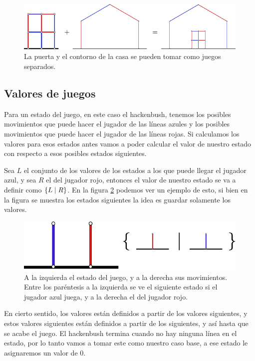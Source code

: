 \begin{figure}[h]
    \centering
    \includegraphics[width=.7\textwidth]{images/hackenbush-sum_example.pdf}
    \caption{La puerta y el contorno de la casa se pueden tomar como juegos separados.}
    \label{figure:hackenbush_sum}
\end{figure}


\subsection{Valores de juegos}

\label{subsection:game_values}

Para un estado del juego, en este caso el hackenbush, tenemos los posibles movimientos que puede hacer el jugador de las l\'ineas azules y los posibles movimientos que puede hacer el jugador de las l\'ineas rojas. Si calculamos los valores para esos estados antes vamos a poder calcular el valor de nuestro estado con respecto a esos posibles estados siguientes.

Sea $L$ el conjunto de los valores de los estados a los que puede llegar el jugador azul, y sea $R$ el del jugador rojo, entonces el valor de nuestro estado se va a definir como $\left\{L\;\middle|\; R\right\}$. En la figura \ref{figure:hackenbush_val} podemos ver un ejemplo de esto, si bien en la figura se muestra los estados siguientes la idea es guardar solamente los valores.

\begin{figure}[h]
    \centering
    \includegraphics[width=.7\textwidth]{images/hackenbush-val_example.pdf}
    \caption{A la izquierda el estado del juego, y a la derecha sus movimientos. Entre los par\'entesis a la izquierda se ve el siguiente estado si el jugador azul juega, y a la derecha el del jugador rojo.}
    \label{figure:hackenbush_val}
\end{figure}

En cierto sentido, los valores est\'an definidos a partir de los valores siguientes, y estos valores siguientes est\'an definidos a partir de los siguientes, y as\'i hasta que se acabe el juego. El hackenbush termina cuando no hay ninguna l\'inea en el estado, por lo tanto vamos a tomar este como nuestro caso base, a ese estado le asignaremos un valor de $0$. 

